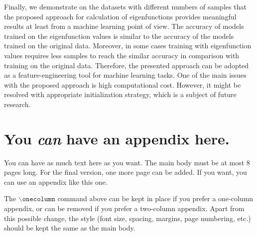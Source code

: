 \documentclass{article}
\theoremstyle{plain}
\theoremstyle{definition}
\theoremstyle{remark}
\begin{document}
Finally, we demonstrate on the datasets with different numbers of samples that the proposed approach for calculation
of eigenfunctions provides meaningful results at least from a machine learning point of view.
The accuracy of models trained on the eigenfunction values is similar to the accuracy of the models trained on the original data.
Moreover, in some cases training with eigenfunction values requires less samples to reach the similar accuracy in
comparison with training on the original data. Therefore, the presented approach can be adopted as a feature-engineering tool
for machine learning tasks. One of the main issues with the proposed approach is high computational cost.
However, it might be resolved with appropriate initialization strategy, which is a subject of future research.





\newpage
\appendix
\onecolumn
\section{You \emph{can} have an appendix here.}

You can have as much text here as you want. The main body must be at most $8$
pages long. For the final version, one more page can be added. If you want, you
can use an appendix like this one.

The $\mathtt{\backslash onecolumn}$ command above can be kept in place if you
prefer a one-column appendix, or can be removed if you prefer a two-column
appendix.  Apart from this possible change, the style (font size, spacing,
margins, page numbering, etc.) should be kept the same as the main body.
\end{document}
